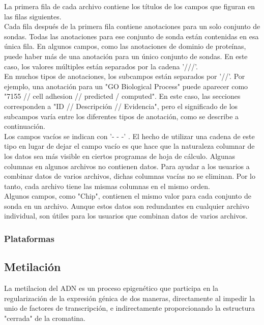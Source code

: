 \documentclass[12pt,letterpaper]{article}
\begin{document}
La primera fila de cada archivo contiene los títulos de los campos que figuran en las filas siguientes.\\

Cada fila después de la primera fila contiene anotaciones para un solo conjunto de sondas. Todas las anotaciones para ese conjunto de sonda están contenidas en esa única fila. En algunos campos, como las anotaciones de dominio de proteínas, puede haber más de una anotación para un único conjunto de sondas. En este caso, los valores múltiples están separados por la cadena '///'.\\

En muchos tipos de anotaciones, los subcampos están separados por '//'. Por ejemplo,  una anotación para un "GO Biological Process" puede aparecer como "7155 // cell adhesion // predicted / computed".  En este caso, las secciones corresponden a "ID // Descripción // Evidencia", pero el significado de los subcampos varía entre los diferentes tipos de anotación, como se describe a continuación.\\

Los campos vacíos se indican con '- - -' . El hecho de utilizar una cadena de este tipo en lugar de dejar el campo vacío es que hace que la naturaleza columnar de los datos sea más visible en ciertos programas de hoja de cálculo.
Algunas columnas en algunos archivos no contienen datos. Para ayudar a los usuarios a combinar datos de varios archivos, dichas columnas vacías no se eliminan. Por lo tanto, cada archivo tiene las mismas columnas en el mismo orden.\\

Algunos campos, como "Chip", contienen el mismo valor para cada conjunto de sonda en un archivo. Aunque estos datos son redundantes en cualquier archivo individual, son útiles para los usuarios que combinan datos de varios archivos.
\subsubsection{Plataformas}


\subsection{Metilación} 
La metilacion del ADN es un proceso epigenético que participa en la regularización de la expresión génica de dos maneras, directamente al impedir la unio de factores de transcripción, e indirectamente proporcionando la estructura "cerrada" de la cromatina.   
\end{document}

